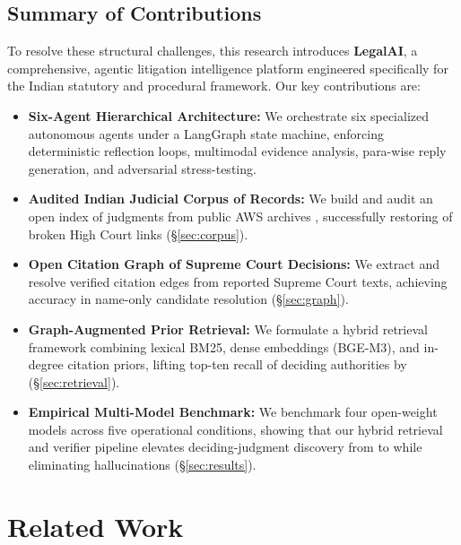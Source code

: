 \documentclass[conference]{IEEEtran}
\begin{document}
\subsection{Summary of Contributions}
To resolve these structural challenges, this research introduces \textbf{LegalAI}, a comprehensive, agentic litigation intelligence platform engineered specifically for the Indian statutory and procedural framework. Our key contributions are:
\begin{itemize}
    \item \textbf{Six-Agent Hierarchical Architecture:} We orchestrate six specialized autonomous agents under a LangGraph state machine, enforcing deterministic reflection loops, multimodal evidence analysis, para-wise reply generation, and adversarial stress-testing.
    \item \textbf{Audited Indian Judicial Corpus of \CorpusTotal{} Records:} We build and audit an open index of \CorpusTotal{} judgments from public AWS archives \cite{awssc,awshc}, successfully restoring \MobileLinkedPct{} of broken High Court links (\S\ref{sec:corpus}).
    \item \textbf{Open Citation Graph of \GraphTextOK{} Supreme Court Decisions:} We extract and resolve \GraphEdges{} verified citation edges from reported Supreme Court texts, achieving \GraphNameSamePct{} accuracy in name-only candidate resolution (\S\ref{sec:graph}).
    \item \textbf{Graph-Augmented Prior Retrieval:} We formulate a hybrid retrieval framework combining lexical BM25, dense embeddings (BGE-M3), and in-degree citation priors, lifting top-ten recall of deciding authorities by \RecPriorRelGain{} (\S\ref{sec:retrieval}).
    \item \textbf{Empirical Multi-Model Benchmark:} We benchmark four open-weight models across five operational conditions, showing that our hybrid retrieval and verifier pipeline elevates deciding-judgment discovery from \RefAllClosed{} to \RefAllTopicPrior{} while eliminating hallucinations (\S\ref{sec:results}).
\end{itemize}

\section{Related Work}
\label{sec:related}
\end{document}
